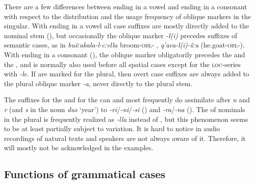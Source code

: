 There are a few differences between  ending in a vowel and  ending in a consonant with respect to the distribution and the usage frequency of oblique markers in the singular. With  ending in a vowel all case suffixes are mostly directly added to the nominal stem (), but occasionally the oblique marker \textit{-l(i)} precedes suffixes of semantic cases, as in \textit{bušːukala-l-cːella} broom-\textsc{obl}- , \textit{q'aca-l(i)-šːu}  (he.goat-\textsc{obl}-). With  ending in a consonant (), the oblique marker obligatorily precedes the  and the , and is normally also used before all spatial cases except for the \textsc{loc}-series with \textit{-le}. If  are marked for the plural, then overt case suffixes are always added to the plural oblique marker \textit{-a}, never directly to the plural stem.

The suffixes for the  and for the  can and most frequently do assimilate after \textit{n} and \textit{r} (and \textit{s} in the noun \textit{dus} `year') to \textit{-ri}/\textit{-ni}/\textit{-si} () and \textit{-ra}/\textit{-na} (). The  of nominals in the plural is frequently realized as \textit{-lla} instead of , but this phenomenon seems to be at least partially subject to variation. It is hard to notice in audio recordings of natural texts and speakers are not always aware of it. Therefore, it will mostly not be acknowledged in the examples. 



\subsection{Functions of grammatical cases} 
\label{ssec:Functionsofgrammaticalcases}



